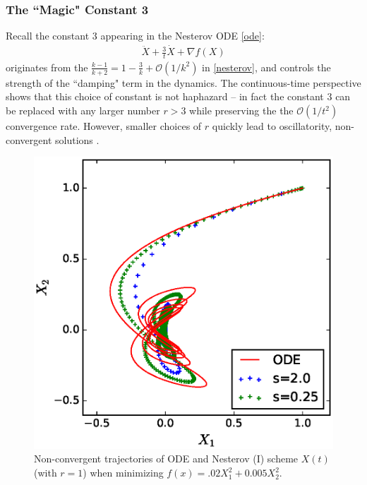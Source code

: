 \subsubsection{The ``Magic" Constant 3}
Recall the constant $3$ appearing in the Nesterov ODE \eqref{ode}:
\begin{align}
    \ddot{X} + \frac{3}{t} \dot{X} + \nabla f(X) 
\end{align}
originates from the $\frac{k-1}{k+2} = 1 - \frac{3}{k} + \mathcal{O}(1/k^2)$ in \eqref{nesterov}, and controls the strength of the ``damping" term in the dynamics. The continuous-time perspective shows that this choice of constant is not haphazard -- in fact the constant $3$ can be replaced with any larger number $r>3$ while preserving the the $\mathcal{O}(1/t^2)$ convergence rate. However, smaller choices of $r$ quickly lead to oscillatority, non-convergent solutions \cite{su2014differential}.
\begin{figure}[H]
\begin{center}
\includegraphics[width=0.5\linewidth]{Experiments/quadratic_traj_compare_annealed_r1.eps}
\caption{Non-convergent trajectories of ODE and Nesterov (I) scheme $X(t)$ (with $r=1$) when minimizing $f(x) = .02 X_1^2 + 0.005 X_2^2$.}
\end{center}
\end{figure}

